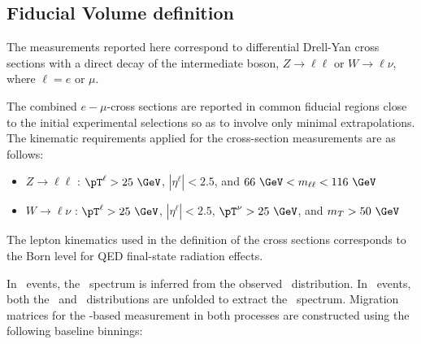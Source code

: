 \subsection{Fiducial Volume definition}
\label{sec:fidvolume}
The measurements reported here correspond to differential
Drell-Yan cross sections with a direct decay of the intermediate boson,  $Z \rightarrow \ell\ell$  or $W \rightarrow \ell\nu$, where $\ell = e$ or $\mu$.

The combined $e-\mu$-cross sections are reported in common
fiducial regions close to the initial experimental selections
so as to involve only minimal extrapolations. The kinematic
requirements applied for the cross-section measurements are
as follows:
\begin{itemize}
\item  $Z \rightarrow \ell\ell$ :
$\pT^{\ell}>25~\GeV$, $|\eta^{\ell}|<2.5$, and $66~\GeV < m_{\ell\ell} <116 ~\GeV$
\item  $W \rightarrow \ell\nu$ :
$\pT^{\ell}>25~\GeV$, $|\eta^{\ell}|<2.5$, $\pT^{\nu}>25~\GeV$, and $m_{T} > 50~\GeV$
\end{itemize}

The lepton kinematics used in the definition of the cross sections corresponds
to the Born level for QED final-state radiation effects.

In \Wboson\ events, the \ptw\ spectrum is inferred from the observed \ut\ distribution. In \Zboson\ events, both the \ptdilep\ and \ut\ distributions are unfolded to extract the \ptz\ spectrum.
Migration matrices for the \ut-based measurement in both processes are constructed using the following baseline binnings:

